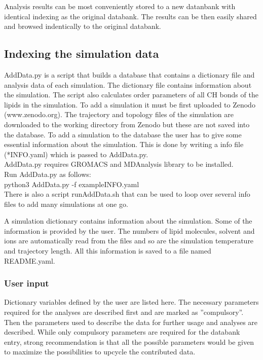 \documentclass[fleqn,10pt]{wlscirep}
\begin{document}
Analysis results can be most conveniently stored to a new datanbank with identical indexing as the original databank. The results can be then easily shared and browsed indentically to the original databank.

\subsection{Indexing the simulation data}

AddData.py is a script that builds a database that contains a dictionary file and analysis data of each simulation. The dictionary file contains information about the simulation. The script also calculates order parameters of all CH bonds of the lipids in the simulation. To add a simulation it must be first uploaded to Zenodo (www.zenodo.org). The trajectory and topology files of the simulation are downloaded to the working directory from Zenodo but these are not saved into the database. To add a simulation to the database the user has to give some essential information about the simulation. This is done by writing a info file (*INFO.yaml) which is passed to AddData.py. 
\newline \\
AddData.py requires GROMACS and MDAnalysis library to be installed.
\newline \\
Run AddData.py as follows:
\newline \\
python3 AddData.py -f exampleINFO.yaml
\newline \\
There is also a script runAddData.sh that can be used to loop over several info files to add many simulations at one go.

A simulation dictionary contains information about the simulation. Some of the information is provided by the user. The numbers of lipid molecules, solvent and ions are automatically read from the files and so are the simulation temperature and trajectory length. All this information is saved to a file named README.yaml.


\subsubsection{User input}
Dictionary variables defined by the user are listed here. 
The necessary parameters required for the analyses are described first and are marked as ''compulsory''. Then the parameters used to describe the data for further usage and analyses are described.
While only compulsory parameters are required for the databank entry, strong recommendation is that all the possible parameters would be given to maximize the possibilities to upcycle the contributed data. 
\end{document}

